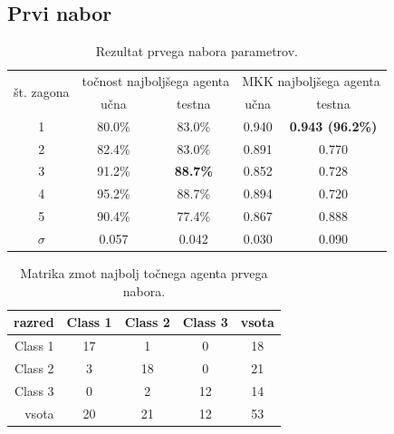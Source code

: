 \subsection{Prvi nabor}\label{subsec:dodatek-wine-prvi-nabor}
\begin{table}[H]
    \begin{center}
        \begin{tabular}{|| c | c c || c c ||}
            \hline
            \multirow{2}{*}{št. zagona} & \multicolumn{2}{c||}{točnost najboljšega agenta} & \multicolumn{2}{c||}{MKK najboljšega agenta} \\ \cline{2-5}
            & učna   & testna          & učna  & testna                  \\
            \hline
            1        & 80.0\% & 83.0\%          & 0.940 & \textbf{0.943 (96.2\%)} \\
            \hline
            2        & 82.4\% & 83.0\%          & 0.891 & 0.770                   \\
            \hline
            3        & 91.2\% & \textbf{88.7\%} & 0.852 & 0.728                   \\
            \hline
            4        & 95.2\% & 88.7\%          & 0.894 & 0.720                   \\
            \hline
            5        & 90.4\% & 77.4\%          & 0.867 & 0.888                   \\
            \hline
            $\sigma$ & 0.057  & 0.042           & 0.030 & 0.090                   \\
            \hline
        \end{tabular}
    \end{center}
    \caption{Rezultat prvega nabora parametrov.}
    \label{tab:wine_result_1}
\end{table}

\begin{table}[H]
    \centering
    \begin{tabular}{||rcccc||}
        \hline
        razred  & Class 1 & Class 2 & Class 3 & vsota \\ \hline
        Class 1 & 17      & 1       & 0       & 18    \\ \hline
        Class 2 & 3       & 18      & 0       & 21    \\ \hline
        Class 3 & 0       & 2       & 12      & 14    \\ \hline
        vsota   & 20      & 21      & 12      & 53    \\ \hline
    \end{tabular}
    \caption{Matrika zmot najbolj točnega agenta prvega nabora.}
    \label{tab:wine_acc_1}
\end{table}

